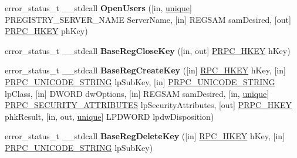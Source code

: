 \begin{DoxyCompactItemize}
\item 
\mbox{\label{interfacewinreg_a28306a593de40ca20fec547d6571322a}} 
error\+\_\+status\+\_\+t \+\_\+\+\_\+stdcall {\bfseries Open\+Users} (\mbox{[}in, \hyperlink{interfaceunique}{unique}\mbox{]} P\+R\+E\+G\+I\+S\+T\+R\+Y\+\_\+\+S\+E\+R\+V\+E\+R\+\_\+\+N\+A\+ME Server\+Name, \mbox{[}in\mbox{]} R\+E\+G\+S\+AM sam\+Desired, \mbox{[}out\mbox{]} \hyperlink{interfacevoid}{P\+R\+P\+C\+\_\+\+H\+K\+EY} ph\+Key)
\item 
\mbox{\label{interfacewinreg_a0de5e76ba2e1dcb80b6899e5ba2dcee6}} 
error\+\_\+status\+\_\+t \+\_\+\+\_\+stdcall {\bfseries Base\+Reg\+Close\+Key} (\mbox{[}in, out\mbox{]} \hyperlink{interfacevoid}{P\+R\+P\+C\+\_\+\+H\+K\+EY} h\+Key)
\item 
\mbox{\label{interfacewinreg_a1047911ad9f1d5d4bf0cc8e89b9a1e01}} 
error\+\_\+status\+\_\+t \+\_\+\+\_\+stdcall {\bfseries Base\+Reg\+Create\+Key} (\mbox{[}in\mbox{]} \hyperlink{interfacevoid}{R\+P\+C\+\_\+\+H\+K\+EY} h\+Key, \mbox{[}in\mbox{]} \hyperlink{struct___r_p_c___u_n_i_c_o_d_e___s_t_r_i_n_g}{P\+R\+P\+C\+\_\+\+U\+N\+I\+C\+O\+D\+E\+\_\+\+S\+T\+R\+I\+NG} lp\+Sub\+Key, \mbox{[}in\mbox{]} \hyperlink{struct___r_p_c___u_n_i_c_o_d_e___s_t_r_i_n_g}{P\+R\+P\+C\+\_\+\+U\+N\+I\+C\+O\+D\+E\+\_\+\+S\+T\+R\+I\+NG} lp\+Class, \mbox{[}in\mbox{]} D\+W\+O\+RD dw\+Options, \mbox{[}in\mbox{]} R\+E\+G\+S\+AM sam\+Desired, \mbox{[}in, \hyperlink{interfaceunique}{unique}\mbox{]} \hyperlink{struct___r_p_c___s_e_c_u_r_i_t_y___a_t_t_r_i_b_u_t_e_s}{P\+R\+P\+C\+\_\+\+S\+E\+C\+U\+R\+I\+T\+Y\+\_\+\+A\+T\+T\+R\+I\+B\+U\+T\+ES} lp\+Security\+Attributes, \mbox{[}out\mbox{]} \hyperlink{interfacevoid}{P\+R\+P\+C\+\_\+\+H\+K\+EY} phk\+Result, \mbox{[}in, out, \hyperlink{interfaceunique}{unique}\mbox{]} L\+P\+D\+W\+O\+RD lpdw\+Disposition)
\item 
\mbox{\label{interfacewinreg_aa19387139d39ed2f267429a0ede98041}} 
error\+\_\+status\+\_\+t \+\_\+\+\_\+stdcall {\bfseries Base\+Reg\+Delete\+Key} (\mbox{[}in\mbox{]} \hyperlink{interfacevoid}{R\+P\+C\+\_\+\+H\+K\+EY} h\+Key, \mbox{[}in\mbox{]} \hyperlink{struct___r_p_c___u_n_i_c_o_d_e___s_t_r_i_n_g}{P\+R\+P\+C\+\_\+\+U\+N\+I\+C\+O\+D\+E\+\_\+\+S\+T\+R\+I\+NG} lp\+Sub\+Key)
\item 
\mbox{\label{interfacewinreg_ac02819efd99a5031b40eaf199859f5a8}} 

\end{DoxyCompactItemize}
